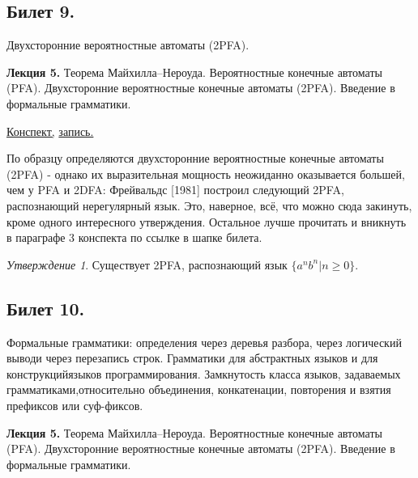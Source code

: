 \documentclass[a4paper]{article}
\newcommand{\mybox}{%
    \collectbox{%
        \setlength{\fboxsep}{1pt}%
        \fbox{\BOXCONTENT}%
    }%
}
\theoremstyle{indented}
\theoremstyle{definition}
\theoremstyle{remark}
\newtheorem{stat}{Утверждение}
\begin{document}
\newpage 

\subsection{Билет 9.}

Двухсторонние вероятностные автоматы (2PFA).

\hrulefill

\textbf{Лекция 5.} Теорема Майхилла–Нероуда. Вероятностные конечные автоматы (PFA). Двухсторонние вероятностные конечные автоматы (2PFA). Введение в формальные грамматики.

\begin{flushright}
    \mybox{
        \href{https://users.math-cs.spbu.ru/~okhotin/teaching/tcs_fl_2021/okhotin_tcs_fl_2021_l5.pdf}{Конспект,}
        \href{https://disk.yandex.ru/d/knoQ44wLmGDwwQ/2021-2022%20учебный%20год%20(осенний%20семестр)/2%20курс/Теоретическая%20информатика/M2021-09-29_111630_1h44m_102.mp4}{запись.}
    }
\end{flushright}

По образцу определяются двухсторонние вероятностные конечные автоматы (2PFA) - однако их выразительная мощность неожиданно оказывается большей, чем у PFA и 2DFA: Фрейвальдс [1981] построил следующий 2PFA, распознающий нерегулярный язык. Это, наверное, всё, что можно сюда закинуть, кроме одного интересного утверждения. Остальное лучше прочитать и вникнуть в параграфе 3 конспекта по ссылке в шапке билета.

\begin{stat}
    Существует 2PFA, распознающий язык $\{ a^n b^n | n \geq 0 \}$.
\end{stat}



\newpage 

\subsection{Билет 10.}

Формальные грамматики: определения через деревья разбора, через логический выводи через перезапись строк. Грамматики для абстрактных языков и для конструкцийязыков программирования. Замкнутость класса языков, задаваемых грамматиками,относительно объединения, конкатенации, повторения и взятия префиксов или суф-фиксов.

\hrulefill

\textbf{Лекция 5.} Теорема Майхилла–Нероуда. Вероятностные конечные автоматы (PFA). Двухсторонние вероятностные конечные автоматы (2PFA). Введение в формальные грамматики.
\end{document}

